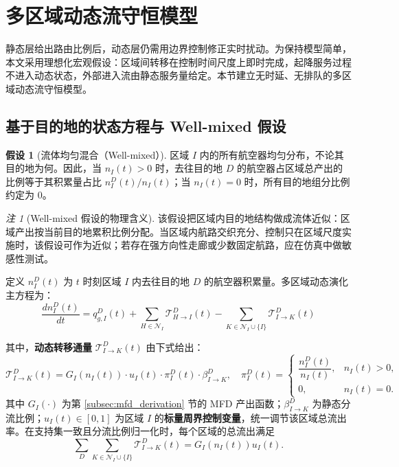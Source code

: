 \documentclass[a4paper,12pt]{article}
\theoremstyle{plain}
\theoremstyle{definition}
\newtheorem{assumption}[theorem]{假设}
\theoremstyle{remark}
\newtheorem{remark}[theorem]{注}
\begin{document}
\section{多区域动态流守恒模型}

静态层给出路由比例后，动态层仍需用边界控制修正实时扰动。为保持模型简单，本文采用理想化宏观假设：区域间转移在控制时间尺度上即时完成，起降服务过程不进入动态状态，外部进入流由静态服务量给定。本节建立无时延、无排队的多区域动态流守恒模型。

\subsection{基于目的地的状态方程与 Well-mixed 假设}

\begin{assumption}[流体均匀混合（Well-mixed）]\label{asm:well_mixed}
区域 $I$ 内的所有航空器均匀分布，不论其目的地为何。因此，当 $n_I(t)>0$ 时，去往目的地 $D$ 的航空器占区域总产出的比例等于其积累量占比 $n_I^D(t)/n_I(t)$；当 $n_I(t)=0$ 时，所有目的地组分比例约定为 $0$。
\end{assumption}

\begin{remark}[Well-mixed 假设的物理含义]
该假设把区域内目的地结构做成流体近似：区域产出按当前目的地累积比例分配。当区域内航路交织充分、控制只在区域尺度实施时，该假设可作为近似；若存在强方向性走廊或少数固定航路，应在仿真中做敏感性测试。
\end{remark}

定义 $n_I^D(t)$ 为 $t$ 时刻区域 $I$ 内去往目的地 $D$ 的航空器积累量。多区域动态演化主方程为：
\begin{equation} \label{eq:dynamic_master}
    \frac{d n_I^D(t)}{dt} = q_{g, I}^D(t) + \sum_{H \in \mathcal{N}_I} \mathcal{T}_{H \to I}^D(t) - \sum_{K \in \mathcal{N}_I \cup \{I\}} \mathcal{T}_{I \to K}^D(t)
\end{equation}

其中，\textbf{动态转移通量} $\mathcal{T}_{I \to K}^D(t)$ 由下式给出：
\begin{equation}\label{eq:transfer_flux}
    \mathcal{T}_{I \to K}^D(t) = G_I(n_I(t)) \cdot u_I(t) \cdot \pi_I^D(t) \cdot \beta_{I \to K}^D,
    \quad
    \pi_I^D(t)=
    \begin{cases}
    \dfrac{n_I^D(t)}{n_I(t)}, & n_I(t)>0,\\[0.8em]
    0, & n_I(t)=0 .
    \end{cases}
\end{equation}
其中 $G_I(\cdot)$ 为第 \ref{subsec:mfd_derivation} 节的 MFD 产出函数；$\beta_{I \to K}^D$ 为静态分流比例；$u_I(t) \in [0, 1]$ 为区域 $I$ 的\textbf{标量周界控制变量}，统一调节该区域总流出率。在支持集一致且分流比例归一化时，每个区域的总流出满足
\begin{equation}\label{eq:total_outflow_identity}
    \sum_D\sum_{K\in\mathcal N_I\cup\{I\}}\mathcal T_{I\to K}^D(t)=G_I(n_I(t))u_I(t).
\end{equation}
\end{document}
